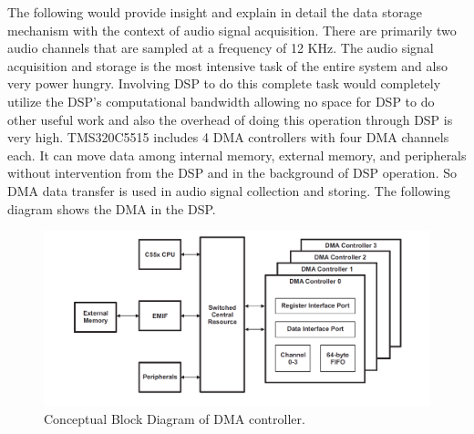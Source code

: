 \hspace{10mm}The following would provide insight and explain in detail the data storage mechanism with the context of audio signal acquisition. There are primarily two audio channels that are sampled at a frequency of 12 KHz. The audio signal acquisition and storage is the most intensive task of the entire system and also very power hungry. Involving DSP to do this complete task would completely utilize the DSP's computational bandwidth allowing no space for DSP to do other useful work and also the overhead of doing this operation through DSP is very high. TMS320C5515 includes 4 DMA controllers with four DMA channels each. It can move data among internal memory, external memory, and peripherals without intervention from the DSP and in the background of DSP operation. So DMA data transfer is used in audio signal collection and storing. The following diagram shows the DMA in the DSP. 
 \begin{figure}[h]
 	\centering
 	\includegraphics[scale = 0.5 ]{DMA_overview.JPG}
 	\caption{Conceptual Block Diagram of DMA controller. \cite{dma}\label{DMA_Architecture}}
 \end{figure} 


